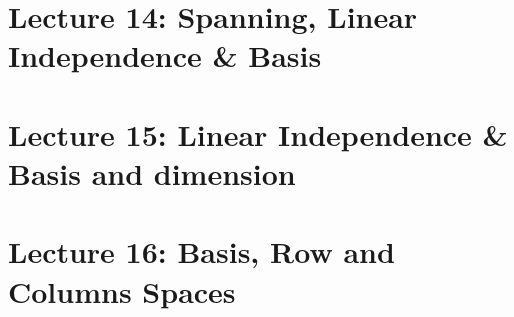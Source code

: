 \documentclass[oneside]{book}
\begin{document}
\newpage
\section{Lecture 14: Spanning, Linear Independence \& Basis}

\section{Lecture 15: Linear Independence \& Basis and dimension}

\section{Lecture 16: Basis, Row and Columns Spaces}
\end{document}
